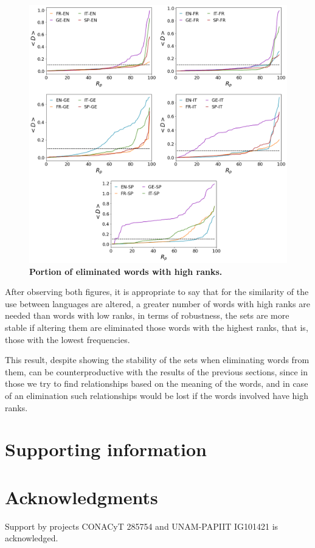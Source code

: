 \documentclass[10pt,letterpaper]{article} %
\begin{document}
	
	\begin{figure}[!h]
		\begin{adjustwidth}{-2.5cm}{1cm}
			\centering
			\includegraphics[scale=.38]{Rp_altos.png}
			\caption{{\bf Portion of eliminated words with high ranks.} }
			\label{fig.RP_high}
		\end{adjustwidth}
	\end{figure}
	
	After observing both figures, it is appropriate to say that for the similarity of the use between languages are altered, a greater number of words with high ranks are needed than words with low ranks, in terms of robustness, the sets are more stable if altering them are eliminated those words with the highest ranks, that is, those with the lowest frequencies.
	
	This result, despite showing the stability of the sets when eliminating words from them, can be counterproductive with the results of the previous sections, since in those we try to find relationships based on the meaning of the words, and in case of an elimination such relationships would be lost if the words involved have high ranks.
	
	
	\section*{Supporting information} %
	\section*{Acknowledgments} %
	
	\nolinenumbers
	
	Support by projects CONACyT 285754 and UNAM-PAPIIT IG101421 is acknowledged. 
	 
\end{document}

